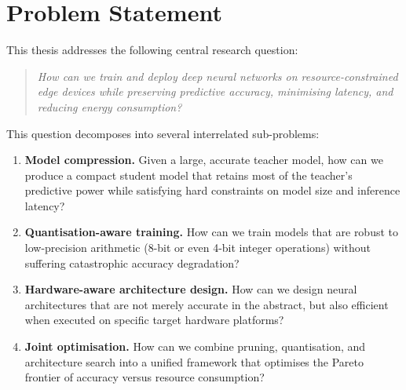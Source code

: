\section{Problem Statement}

This thesis addresses the following central research question:

\begin{quote}
\itshape How can we train and deploy deep neural networks on
resource-constrained edge devices while preserving predictive accuracy,
minimising latency, and reducing energy consumption?
\end{quote}

This question decomposes into several interrelated sub-problems:

\begin{enumerate}[label=(\arabic*)]
  \item \textbf{Model compression.} Given a large, accurate teacher
  model, how can we produce a compact student model that retains most of
  the teacher's predictive power while satisfying hard constraints on
  model size and inference latency?

  \item \textbf{Quantisation-aware training.} How can we train models
  that are robust to low-precision arithmetic (8-bit or even 4-bit
  integer operations) without suffering catastrophic accuracy
  degradation?

  \item \textbf{Hardware-aware architecture design.} How can we design
  neural architectures that are not merely accurate in the abstract, but
  also efficient when executed on specific target hardware platforms?

  \item \textbf{Joint optimisation.} How can we combine pruning,
  quantisation, and architecture search into a unified framework that
  optimises the Pareto frontier of accuracy versus resource consumption?
\end{enumerate}

